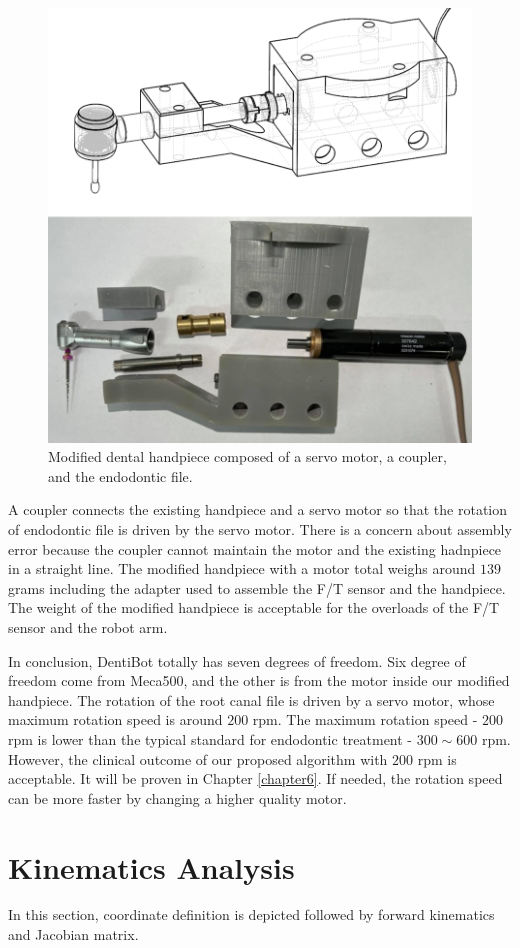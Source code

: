 \begin{figure}[htbp]
\begin{center}
\includegraphics[width=0.7\linewidth]{Images/modified_handpiece.png}
\caption{
Modified dental handpiece composed of a servo motor, a coupler, and the endodontic file.
}\label{fig:modified_handpiece}
\end{center}
\end{figure}	
\par\noindent
A coupler connects the existing handpiece and a servo motor so that the rotation of endodontic file is driven by the servo motor. There is a concern about assembly error because the coupler cannot maintain the motor and the existing hadnpiece in a straight line. The modified handpiece with a motor total weighs around $139$ grams including the adapter used to assemble the F/T sensor and the handpiece. The weight of the modified handpiece is acceptable for the overloads of the F/T sensor and the robot arm.
\par
In conclusion, DentiBot totally has seven degrees of freedom. Six degree of freedom come from Meca500, and the other is from the motor inside our modified handpiece. The rotation of the root canal file is driven by a servo motor, whose maximum rotation speed is around $200$ rpm. The maximum rotation speed - $200$ rpm is lower than the typical standard for endodontic treatment - $300 \sim 600$ rpm. However, the clinical outcome of our proposed algorithm with $200$ rpm is acceptable. It will be proven in Chapter \ref{chapter6}. If needed, the rotation speed can be more faster by changing a higher quality motor.
\newpage													
\section{Kinematics Analysis}
\label{sec:kinematics}
\hspace*{6mm}In this section, coordinate definition is depicted followed by forward kinematics and Jacobian matrix.

